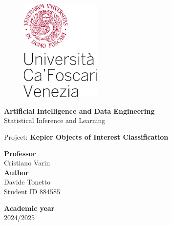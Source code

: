 \begin{titlepage}
\begin{figure}[!htb]
    \includegraphics[width=4cm]{Immagini/logo 2 unive.png}
\end{figure}

\begin{center}
    \vspace{13mm}
    \normalsize{\textbf{Artificial Intelligence and Data Engineering}}
    \vspace{13mm}
    \\ \normalsize{Statistical Inference and Learning}
\end{center}

\vspace{10mm}
\begin{center}
    \LARGE{Project: \textbf{Kepler Objects of Interest Classification}}
\end{center}

\vspace*{\fill}

\begin{minipage}[t]{1\textwidth}
    {\normalsize{\textbf{Professor}}{\normalsize\vspace{1mm}
    \\ \normalsize{Cristiano Varin }}} \\ 
        
    {\normalsize{\textbf{Author}}{\normalsize\vspace{1mm}
    \\ \normalsize{Davide Tonetto}\\
    \normalsize{Student ID 884585 }}} \\
\end{minipage}

\begin{flushleft}
    {\normalsize{\textbf{Academic year}}{\normalsize\vspace{1mm}
    \\ \normalsize{2024/2025}}}  
\end{flushleft}

\end{titlepage}
